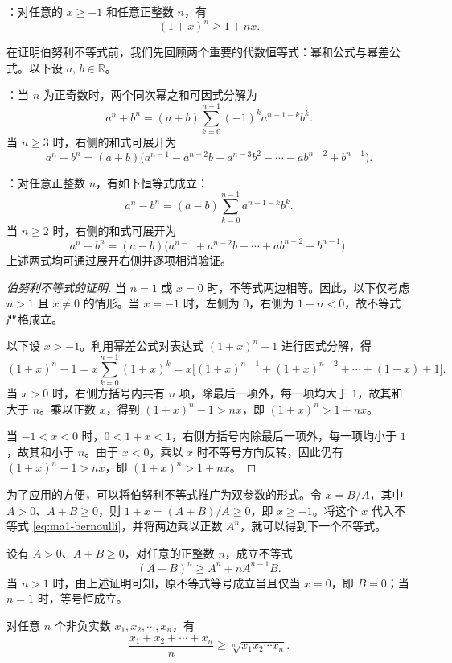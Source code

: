 \documentclass[UTF8,12pt,a4paper,fontset=fandol]{ctexbook}
\begin{document}
：对任意的 $x\geqslant -1$ 和任意正整数 $n$，有
\begin{equation}
  \label{eq:ma1-bernoulli}
  (1+x)^n\geqslant 1+nx.
\end{equation}


在证明伯努利不等式前，我们先回顾两个重要的代数恒等式：幂和公式与幂差公式。以下设 $a,\,b\in\mathbb{R}$。


：当 $n$ 为正奇数时，两个同次幂之和可因式分解为
\[
  a^n+b^n=(a+b)\sum_{k=0}^{n-1}(-1)^k a^{n-1-k}b^k.
\]
当 $n\geqslant3$ 时，右侧的和式可展开为
\[
  a^n+b^n=(a+b)\bigl(a^{n-1}-a^{n-2}b+a^{n-3}b^2-\cdots-ab^{n-2}+b^{n-1}\bigr).
\]


：对任意正整数 $n$，有如下恒等式成立：
\[
  a^n-b^n=(a-b)\sum_{k=0}^{n-1}a^{n-1-k}b^k.
\]
当 $n\geqslant2$ 时，右侧的和式可展开为
\[
  a^n-b^n=(a-b)\bigl(a^{n-1}+a^{n-2}b+\cdots+ab^{n-2}+b^{n-1}\bigr).
\]
上述两式均可通过展开右侧并逐项相消验证。


\begin{proof}[伯努利不等式的证明]
当 $n=1$ 或 $x=0$ 时，不等式两边相等。因此，以下仅考虑 $n>1$ 且 $x\ne0$ 的情形。当 $x=-1$ 时，左侧为 $0$，右侧为 $1-n<0$，故不等式严格成立。

以下设 $x>-1$。利用幂差公式对表达式 $(1+x)^n-1$ 进行因式分解，得
\[
  (1+x)^n-1
  =x\sum_{k=0}^{n-1}(1+x)^k
  =x\bigl[(1+x)^{n-1}+(1+x)^{n-2}+\cdots+(1+x)+1\bigr].
\]
当 $x>0$ 时，右侧方括号内共有 $n$ 项，除最后一项外，每一项均大于 $1$，故其和大于 $n$。乘以正数 $x$，得到 $(1+x)^n-1>nx$，即 $(1+x)^n>1+nx$。

当 $-1<x<0$ 时，$0<1+x<1$，右侧方括号内除最后一项外，每一项均小于 $1$，故其和小于 $n$。由于 $x<0$，乘以 $x$ 时不等号方向反转，因此仍有 $(1+x)^n-1>nx$，即 $(1+x)^n>1+nx$。
\end{proof}


为了应用的方便，可以将伯努利不等式推广为双参数的形式。令 $x=B/A$，其中 $A>0$、$A+B\geqslant0$，则 $1+x=(A+B)/A\geqslant0$，即 $x\geqslant-1$。将这个 $x$ 代入不等式 \eqref{eq:ma1-bernoulli}，并将两边乘以正数 $A^n$，就可以得到下一个不等式。

设有 $A>0$、$A+B\geqslant0$，对任意的正整数 $n$，成立不等式
\begin{equation}
  \label{eq:ma1-bernoulli-two-parameters}
  (A+B)^n\geqslant A^n+nA^{n-1}B.
\end{equation}
当 $n>1$ 时，由上述证明可知，原不等式等号成立当且仅当 $x=0$，即 $B=0$；当 $n=1$ 时，等号恒成立。

\noindent{}\quad 对任意 $n$ 个非负实数 $x_1,x_2,\cdots,x_n$，有
\[
  \frac{x_1+x_2+\cdots+x_n}{n}\geqslant \sqrt[n]{x_1x_2\cdots x_n}.
\]
\end{document}
